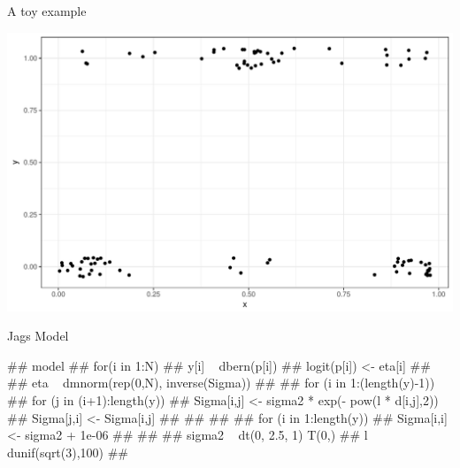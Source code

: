 \documentclass[11pt,ignorenonframetext,]{beamer}
\let\oldShaded\Shaded
\let\endoldShaded\endShaded
\let\oldverbatim\verbatim
\let\endoldverbatim\endverbatim
\renewenvironment{verbatim}{\footnotesize\begin{spacing}{0.9}\oldverbatim}{\endoldverbatim\end{spacing}}
\newcommand{\footnoteoutput}{
  \renewenvironment{Shaded}{\footnotesize\begin{spacing}{0.9}\oldShaded}{\endoldShaded\end{spacing}}
  \renewenvironment{verbatim}{\footnotesize\begin{spacing}{0.9}\oldverbatim}{\endoldverbatim\end{spacing}}
}
\begin{document}
\begin{frame}{A toy example}

\includegraphics{Lec15_files/figure-beamer/unnamed-chunk-23-1.pdf}

\end{frame}

\begin{frame}[fragile]{Jags Model}

\footnoteoutput

\begin{verbatim}
## model{
##   for(i in 1:N) {
##     y[i] ~ dbern(p[i])
##     logit(p[i]) <- eta[i]
##   }
##   eta ~ dmnorm(rep(0,N), inverse(Sigma))
## 
##   for (i in 1:(length(y)-1)) {
##     for (j in (i+1):length(y)) {
##       Sigma[i,j] <- sigma2 * exp(- pow(l * d[i,j],2))
##       Sigma[j,i] <- Sigma[i,j]
##     }
##   }
## 
##   for (i in 1:length(y)) {
##     Sigma[i,i] <- sigma2 + 1e-06
##   }  
## 
##   sigma2 ~ dt(0, 2.5, 1) T(0,)
##   l ~ dunif(sqrt(3),100)
## }
\end{verbatim}

\end{frame}
\end{document}
